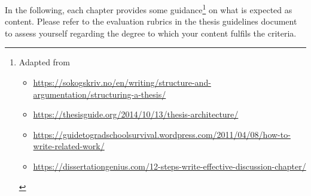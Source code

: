 In the following, each chapter provides some guidance\footnote{Adapted from
\begin{itemize}[nolistsep]
    \item \url{https://sokogskriv.no/en/writing/structure-and-argumentation/structuring-a-thesis/}
    \item \url{https://thesisguide.org/2014/10/13/thesis-architecture/}
    \item \url{https://guidetogradschoolsurvival.wordpress.com/2011/04/08/how-to-write-related-work/}
    \item \url{https://dissertationgenius.com/12-steps-write-effective-discussion-chapter/}
\end{itemize}} on what is expected as content. Please refer to the evaluation rubrics in the thesis guidelines document~\cite{guidelines_DP-BTH} to assess yourself regarding the degree to which your content fulfils the criteria.